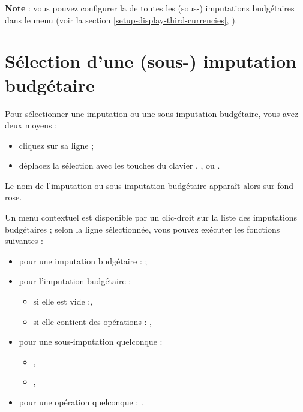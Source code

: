 \ifIllustration
\else
\fi

\textbf{Note} : vous pouvez configurer la  de toutes les (sous-) imputations budgétaires dans le menu  (voir la section \vref{setup-display-third-currencies}, ).


\section{Sélection d'une (sous-) imputation budgétaire\label{budgetarylines-selection}}


Pour sélectionner une imputation ou une sous-imputation budgétaire, vous avez deux moyens :

\begin{itemize}
	 \item cliquez sur sa ligne ;
	 \item déplacez la sélection avec les touches du clavier , ,  ou .
\end{itemize}

Le nom de l'imputation ou sous-imputation budgétaire apparaît alors sur fond rose{\couleur}.

Un menu contextuel est disponible par un clic-droit sur la liste des imputations budgétaires ; selon la ligne sélectionnée, vous pouvez exécuter les fonctions suivantes :

\begin{itemize}
	 \item pour une imputation budgétaire :  ;
	 \item pour l'imputation budgétaire  :
		\begin{itemize}
			 \item si elle est vide :,
			 \item si elle contient des opérations : ,
		\end{itemize}
	 \item pour	une sous-imputation quelconque :	
		\begin{itemize}
			 \item {},
			 \item {},			 
		\end{itemize}		
	 \item pour une opération quelconque : .	
\end{itemize}


